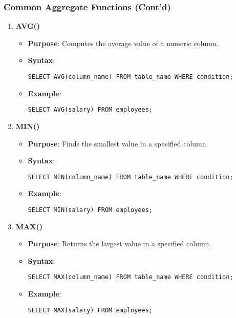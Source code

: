 \documentclass{beamer}
\begin{document}
\begin{frame}[fragile]
    \frametitle{Common Aggregate Functions (Cont'd)}
    \begin{enumerate}[resume]
        \item \textbf{AVG()}
        \begin{itemize}
            \item \textbf{Purpose}: Computes the average value of a numeric column.
            \item \textbf{Syntax}:
            \begin{lstlisting}
SELECT AVG(column_name) FROM table_name WHERE condition;
\end{lstlisting}
            \item \textbf{Example}:
            \begin{lstlisting}
SELECT AVG(salary) FROM employees;
\end{lstlisting}
        \end{itemize}

        \item \textbf{MIN()}
        \begin{itemize}
            \item \textbf{Purpose}: Finds the smallest value in a specified column.
            \item \textbf{Syntax}:
            \begin{lstlisting}
SELECT MIN(column_name) FROM table_name WHERE condition;
\end{lstlisting}
            \item \textbf{Example}:
            \begin{lstlisting}
SELECT MIN(salary) FROM employees;
\end{lstlisting}
        \end{itemize}

        \item \textbf{MAX()}
        \begin{itemize}
            \item \textbf{Purpose}: Returns the largest value in a specified column.
            \item \textbf{Syntax}:
            \begin{lstlisting}
SELECT MAX(column_name) FROM table_name WHERE condition;
\end{lstlisting}
            \item \textbf{Example}:
            \begin{lstlisting}
SELECT MAX(salary) FROM employees;
\end{lstlisting}
        \end{itemize}
    \end{enumerate}
\end{frame}
\end{document}
